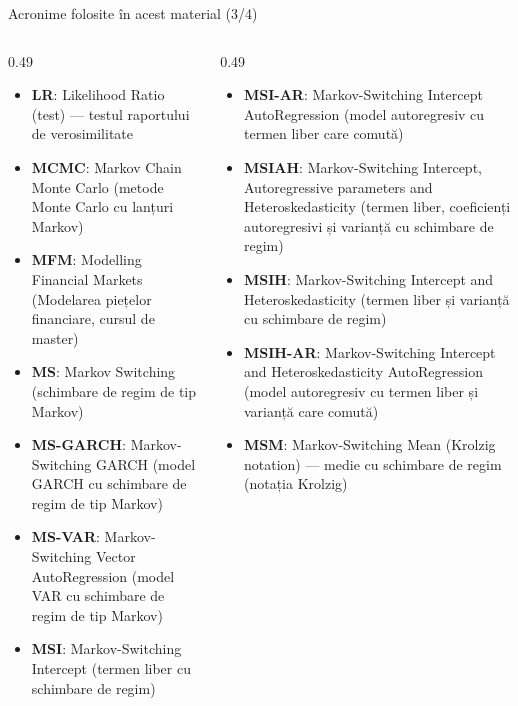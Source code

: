 \begin{frame}{Acronime folosite în acest material (3/4)}
\begin{columns}[T]
\begin{column}{0.49\textwidth}
\begin{itemize}\setlength{\itemsep}{0pt}
    \item \textbf{LR}: Likelihood Ratio (test) — testul raportului de verosimilitate
    \item \textbf{MCMC}: Markov Chain Monte Carlo (metode Monte Carlo cu lanțuri Markov)
    \item \textbf{MFM}: Modelling Financial Markets (Modelarea piețelor financiare, cursul de master)
    \item \textbf{MS}: Markov Switching (schimbare de regim de tip Markov)
    \item \textbf{MS-GARCH}: Markov-Switching GARCH (model GARCH cu schimbare de regim de tip Markov)
    \item \textbf{MS-VAR}: Markov-Switching Vector AutoRegression (model VAR cu schimbare de regim de tip Markov)
    \item \textbf{MSI}: Markov-Switching Intercept (termen liber cu schimbare de regim)
\end{itemize}
\end{column}
\begin{column}{0.49\textwidth}
\begin{itemize}\setlength{\itemsep}{0pt}
    \item \textbf{MSI-AR}: Markov-Switching Intercept AutoRegression (model autoregresiv cu termen liber care comută)
    \item \textbf{MSIAH}: Markov-Switching Intercept, Autoregressive parameters and Heteroskedasticity (termen liber, coeficienți autoregresivi și varianță cu schimbare de regim)
    \item \textbf{MSIH}: Markov-Switching Intercept and Heteroskedasticity (termen liber și varianță cu schimbare de regim)
    \item \textbf{MSIH-AR}: Markov-Switching Intercept and Heteroskedasticity AutoRegression (model autoregresiv cu termen liber și varianță care comută)
    \item \textbf{MSM}: Markov-Switching Mean (Krolzig notation) — medie cu schimbare de regim (notația Krolzig)
\end{itemize}
\end{column}
\end{columns}
\end{frame}
